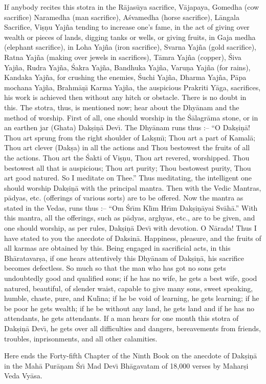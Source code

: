 If anybody recites this stotra in the R\=ajas\=uya sacrifice, V\=ajapaya, Gomedha (cow sacrifice) Naramedha (man sacrifice), A\'svamedha (horse sacrifice), L\=angala Sacrifice, Vi\d{s}\d{n}u Yaj\~na tending to increase one's fame, in the act of giving over wealth or pieces of lands, digging tanks or wells, or giving fruits, in Gaja medha (elephant sacrifice), in Loha Yaj\~na (iron sacrifice), Svarna Yaj\~na (gold sacrifice), Ratna Yaj\~na (making over jewels in sacrifices), T\=amra Yaj\~na (copper), \'Siva Yaj\~na, Rudra Yaj\~na, \'Sakra Yaj\~na, Bandhuka Yaj\~na, Varu\d{n}a Yaj\~na (for rains), Kandaka Yaj\~na, for crushing the enemies, \'Suchi Yaj\~na, Dharma Yaj\~na, P\=apa mochana Yaj\~na, Brahm\=a\d{n}\={\i} Karma Yaj\~na, the auspicious Prakriti Y\=aga, sacrifices, his work is achieved then without any hitch or obstacle. There is no doubt in this. The stotra, thus, is mentioned now; hear about the Dhy\=anam and the method of worship. First of all, one should worship in the \'S\=alagr\=ama stone, or in an earthen jar (Ghata) Dak\d{s}i\d{n}\=a Dev\={\i}. The Dhy\=anam runs thus :-- ``O Dak\d{s}i\d{n}\=a! Thou art sprung from the right shoulder of Lak\d{s}m\={\i}; Thou art a part of Kamal\=a; Thou art clever (Dak\d{s}a) in all the actions and Thou bestowest the fruits of all the actions. Thou art the \'Sakti of Vi\d{s}\d{n}u, Thou art revered, worshipped. Thou bestowest all that is auspicious; Thou art purity; Thou bestowest purity, Thou art good natured. So I meditate on Thee.'' Thus meditating, the intelligent one should worship Dak\d{s}i\d{n}\=a with the principal mantra. Then with the Vedic Mantras, p\=adyas, etc. (offerings of various sorts) are to be offered. Now the mantra as stated in the Vedas, runs thus :-- ``Om \'Sr\={\i}m Kl\={\i}m Hr\={\i}m Dak\d{s}i\d{n}\=ayai Sv\=ah\=a.'' With this mantra, all the offerings, such as p\=adyas, arghyas, etc., are to be given, and one should worship, as per rules, Dak\d{s}i\d{n}\=a Dev\={\i} with devotion. O N\=arada! Thus I have stated to you the anecdote of Daksin\=a. Happiness, pleasure, and the fruits of all karmas are obtained by this. Being engaged in sacrificial acts, in this Bh\=aratavar\d{s}a, if one hears attentively this Dhy\=anam of Dak\d{s}i\d{n}\=a, his sacrifice becomes defectless. So much so that the man who has got no sons gets undoubtedly good and qualified sons; if he has no wife, he gets a best wife, good natured, beautiful, of slender waist, capable to give many sons, sweet speaking, humble, chaste, pure, and Kul\={\i}na; if he be void of learning, he gets learning; if he be poor he gets wealth; if he be without any land, he gets land and if he has no attendants, he gets attendants. If a man hears for one month this stotra of Dak\d{s}i\d{n}\=a Dev\={\i}, he gets over all difficulties and dangers, bereavements from friends, troubles, inprisonments, and all other calamities.

Here ends the Forty-fifth Chapter of the Ninth Book on the anecdote of Dak\d{s}i\d{n}\=a in the Mah\=a Pur\=a\d{n}am \'Sr\={\i} Mad Dev\={\i} Bh\=agavatam of 18,000 verses by Mahar\d{s}i Veda Vy\=asa.



